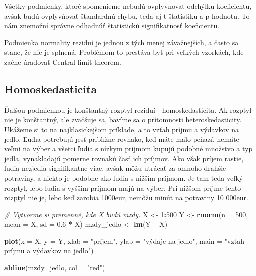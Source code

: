 \documentclass[]{article}
\newenvironment{Shaded}{\begin{snugshade}}{\end{snugshade}}
\newcommand{\CommentTok}[1]{\textcolor[rgb]{0.56,0.35,0.01}{\textit{#1}}}
\newcommand{\DataTypeTok}[1]{\textcolor[rgb]{0.13,0.29,0.53}{#1}}
\newcommand{\DecValTok}[1]{\textcolor[rgb]{0.00,0.00,0.81}{#1}}
\newcommand{\FloatTok}[1]{\textcolor[rgb]{0.00,0.00,0.81}{#1}}
\newcommand{\KeywordTok}[1]{\textcolor[rgb]{0.13,0.29,0.53}{\textbf{#1}}}
\newcommand{\NormalTok}[1]{#1}
\newcommand{\OperatorTok}[1]{\textcolor[rgb]{0.81,0.36,0.00}{\textbf{#1}}}
\newcommand{\StringTok}[1]{\textcolor[rgb]{0.31,0.60,0.02}{#1}}
\begin{document}
Všetky podmienky, ktoré spomenieme nebudú ovplyvnovať odchýlku
koeficientu, avšak budú ovplyvňovať štandardnú chybu, teda aj
t-štatistiku a p-hodnotu. To nám znemožní správne odhadnúť štatistickú
signifikatnosť koeficientu.

Podmienka normality reziduí je jednou z tých menej závažnejších, a často
sa stane, že nie je splnená. Problémom to prestáva byť pri veľkých
vzorkách, kde začne úradovať Central limit theorem.

\hypertarget{homoskedasticita}{%
\subsection{Homoskedasticita}\label{homoskedasticita}}

Ďalšou podmienkou je konštantný rozptyl reziduí - homoskedasticita. Ak
rozptyl nie je konštantný, ale zväčšuje sa, bavíme sa o prítomnosti
heteroskedasticity. Ukážeme si to na najklasickejšom príklade, a to
vzťah príjmu a výdavkov na jedlo. Ľudia potrebujú jesť približne
rovnako, keď máte málo peňazí, nemáte veľmi na výber a všetci ľudia s
nízkym príjmom kupujú podobné množstvo a typ jedla, vynakladajú pomerne
rovnakú časť ich príjmov. Ako však príjem rastie, ľudia nezjedia
signifikantne viac, avšak môžu utrácať za omnoho drahšie potraviny, a
niekto je podobne ako ľudia s nižším príjmom. Je tam teda veľký rozptyl,
lebo ľudia s vyšším príjmom majú na výber. Pri nižšom príjme tento
rozptyl nie je, lebo keď zarobia 1000eur, nemôžu minút na potraviny 10
000eur.

\begin{Shaded}
\begin{Highlighting}[]
\CommentTok{# Vytvorme si premenné, kde X budú mzdy.}
\NormalTok{X <-}\StringTok{ }\DecValTok{1}\OperatorTok{:}\DecValTok{500}
\NormalTok{Y <-}\StringTok{ }\KeywordTok{rnorm}\NormalTok{(}\DataTypeTok{n =} \DecValTok{500}\NormalTok{, }\DataTypeTok{mean =}\NormalTok{ X, }\DataTypeTok{sd =} \FloatTok{0.6} \OperatorTok{*}\StringTok{ }\NormalTok{X)}
\NormalTok{mzdy_jedlo <-}\StringTok{ }\KeywordTok{lm}\NormalTok{(Y }\OperatorTok{~}\StringTok{ }\NormalTok{X)}

\KeywordTok{plot}\NormalTok{(}\DataTypeTok{x =}\NormalTok{ X, }\DataTypeTok{y =}\NormalTok{ Y, }\DataTypeTok{xlab =} \StringTok{"príjem"}\NormalTok{, }\DataTypeTok{ylab =} \StringTok{"výdaje na jedlo"}\NormalTok{,}
     \DataTypeTok{main =} \StringTok{"vzťah príjmu a výdavkov na jedlo"}\NormalTok{)}

\KeywordTok{abline}\NormalTok{(mzdy_jedlo, }\DataTypeTok{col =} \StringTok{"red"}\NormalTok{)}
\end{Highlighting}
\end{Shaded}
\end{document}
